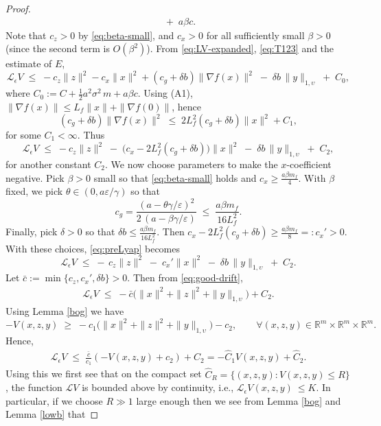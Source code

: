 \documentclass[11pt, a4paper,leqno]{amsart}
\theoremstyle{definition}
\numberwithin{equation}{section}
\newcommand{\R}{\mathbb R}
\begin{document}
\begin{proof}
\begin{align}
\;+\;a\beta c.
\end{align}
Note that $c_z>0$ by \eqref{eq:beta-small}, and $c_x>0$ for all sufficiently small $\beta>0$ (since the second term is $O(\beta^2)$). From \eqref{eq:LV-expanded}, \eqref{eq:T123} and the estimate of $E$,
\[
\mathcal{L}_\epsilon V \;\le\; -c_z\|z\|^2 - c_x\|x\|^2 + (c_g+\delta b)\|\nabla f(x)\|^2
\;-\;\delta b\,\|y\|_{1,\upsilon} \;+\; C_0,
\]
where $C_0:=C + \tfrac12 a^2\sigma^2\, m + a\beta c$.
Using (A1), $\|\nabla f(x)\|\le L_f\|x\|+\|\nabla f(0)\|$, hence
\[
(c_g+\delta b)\|\nabla f(x)\|^2 \;\le\; 2L_f^2(c_g+\delta b)\|x\|^2 + C_1,
\]
for some $C_1<\infty$. Thus
\begin{equation}\label{eq:preLyap}
\mathcal{L}_\epsilon V \;\le\; -c_z\|z\|^2 \;-\;\bigl(c_x-2L_f^2(c_g+\delta b)\bigr)\|x\|^2
\;-\;\delta b\,\|y\|_{1,\upsilon} \;+\; C_2,
\end{equation}
for another constant $C_2$. We now choose parameters to make the $x$-coefficient negative.
Pick $\beta>0$ small so that \eqref{eq:beta-small} holds and $c_x\ge \tfrac{a\beta m_f}{4}$. With $\beta$ fixed, we pick $\theta\in(0,a\varepsilon/\gamma)$ so that
\[
c_g=\frac{(a-\theta\gamma/\varepsilon)^2}{2\,(a-\beta\gamma/\varepsilon)}
\;\le\;\frac{a\beta m_f}{16L_f^2}.
\]
Finally, pick $\delta>0$ so that $\delta b\le \tfrac{a\beta m_f}{16L_f^2}$.
Then $c_x-2L_f^2(c_g+\delta b)\ge \tfrac{a\beta m_f}{8}=:c_x'>0$.
With these choices, \eqref{eq:preLyap} becomes
\begin{equation}\label{eq:good-drift}
\mathcal{L}_\epsilon V \;\le\; -\,c_z\|z\|^2 \;-\;c_x'\|x\|^2 \;-\;\delta b\,\|y\|_{1,\upsilon} \;+\; C_2.
\end{equation}
Let $\bar c:=\min\{c_z,c_x',\delta b\}>0$.
Then from \eqref{eq:good-drift},
\begin{align}\label{Adda-}
\mathcal{L}_\epsilon V \;\le\; -\bar c \bigl(\|x\|^2+\|z\|^2+\|y\|_{1,\upsilon}\bigr) + C_2.
\end{align}
Using Lemma \ref{bog} we have
\begin{equation}\label{eq:drift-ineqlapa}
-V(x,z,y)\;\geq\;  -c_1\bigl(\|x\|^2+\|z\|^2+\|y\|_{1,\upsilon}\bigr) -c_2,
\qquad \forall (x,z,y)\in\R^{m}\times \R^m\times\R^m.
\end{equation}
Hence,
\begin{align}\label{Adda-}
\mathcal{L}_\epsilon V \;\le\; \frac {\bar c}{c_1} (-V(x,z,y)+c_2) + C_2=-\hat C_1V(x,z,y)+\hat C_2.
\end{align}
Using this we first see that on the compact set $\hat C_R=\{(x,z,y): V(x,z,y)\le R\}$, the function $\mathcal L V$ is bounded above by continuity, i.e., $\mathcal L_\epsilon V(x,z,y)\ \le K$. In particular, if we choose $R\gg 1$ large enough then we see from Lemma \ref{bog} and Lemma \ref{lowb} that

\end{proof}
\end{document}
